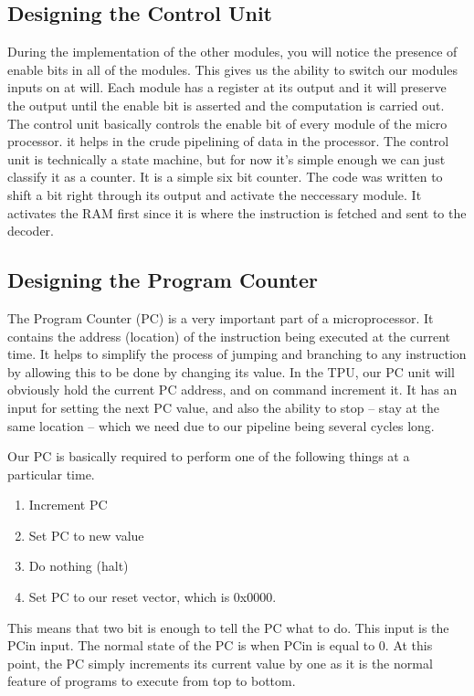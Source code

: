 \subsection{Designing the Control Unit}
During the implementation of the other modules, you will notice the presence of enable bits in all of the modules. This gives us the ability to switch our modules inputs on at will. Each module has a register at its output and it will preserve the output until the enable bit is asserted and the computation is carried out.  
The control unit basically controls the enable bit of every module of the micro processor. it helps in the crude pipelining of data in the processor. 
The control unit is technically a state machine, but for now it’s simple enough we can just classify it as a counter. It is a simple six bit counter. The code was written to shift a bit right through its output and activate the neccessary module. It activates the RAM first since it is where the instruction is fetched and sent to the decoder.


\subsection{Designing the Program Counter}
The Program Counter (PC) is a very important part of a microprocessor. It contains the address (location) of the instruction being executed at the current time.  It helps to simplify the process of jumping and branching to any instruction by allowing this to be done by changing its value.
In the TPU, our PC unit will obviously hold the current PC address, and on command increment it. It has an input for setting the next PC value, and also the ability to stop – stay at the same location – which we need due to our pipeline being several cycles long.

Our PC is basically required to perform one of the following things at a particular time.
\begin{enumerate}
\item Increment PC
\item Set PC to new value
\item Do nothing (halt)
\item Set PC to our reset vector, which is 0x0000.
\end{enumerate}

This means that two bit is enough to tell the PC what to do. This input is the PCin input. The normal state of the PC is when PCin is equal to 0. At this point, the PC simply increments its current value by one as it is the normal feature of programs to execute from top to bottom.

